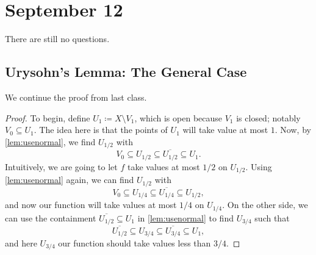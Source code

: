 \documentclass[../notes.tex]{subfiles}
\begin{document}
\section{September 12}

There are still no questions.

\subsection{Urysohn's Lemma: The General Case}
We continue the proof from last class.
\urythm*
\begin{proof}
	To begin, define $U_1\coloneqq X\setminus V_1$, which is open because $V_1$ is closed; notably $V_0\subseteq U_1$. The idea here is that the points of $U_1$ will take value at most $1$. Now, by \autoref{lem:usenormal}, we find $U_{1/2}$ with
	\[V_0\subseteq U_{1/2}\subseteq\overline{U_{1/2}}\subseteq U_1.\]
	Intuitively, we are going to let $f$ take values at most $1/2$ on $U_{1/2}$. Using \autoref{lem:usenormal} again, we can find $U_{1/2}$ with
	\[V_0\subseteq U_{1/4}\subseteq\overline{U_{1/4}}\subseteq U_{1/2},\]
	and now our function will take values at most $1/4$ on $U_{1/4}$. On the other side, we can use the containment $\overline{U_{1/2}}\subseteq U_1$ in \autoref{lem:usenormal} to find $U_{3/4}$ such that
	\[\overline{U_{1/2}}\subseteq U_{3/4}\subseteq\overline{U_{3/4}}\subseteq U_1,\]
	and here $U_{3/4}$ our function should take values less than $3/4$.


\end{proof}
\end{document}
